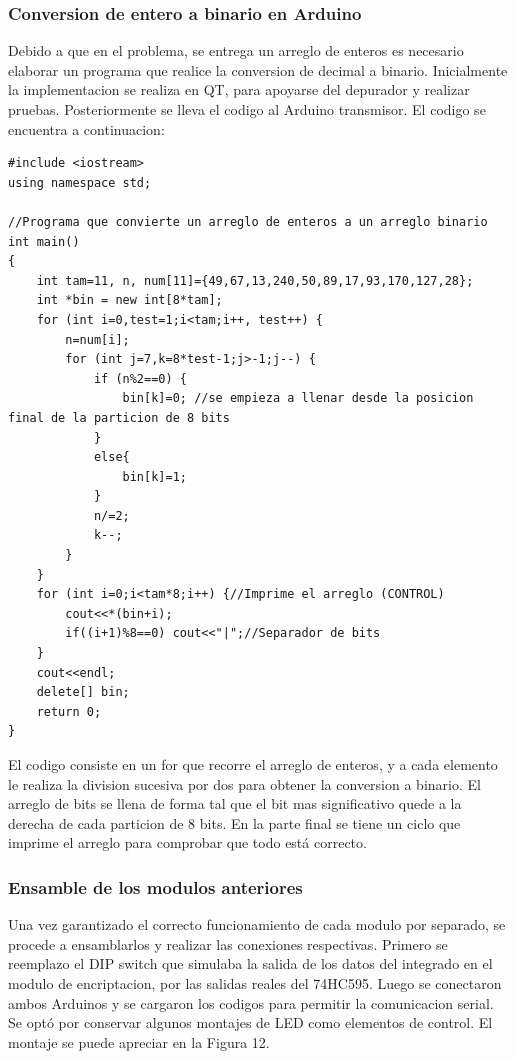 \documentclass{article}
\begin{document}
\subsubsection{Conversion de entero a binario en Arduino}
Debido a que en el problema, se entrega un arreglo de enteros es necesario elaborar un programa que realice la conversion de decimal a binario. Inicialmente la implementacion se realiza en QT, para apoyarse del depurador y realizar pruebas. Posteriormente se lleva el codigo al Arduino transmisor. El codigo se encuentra a continuacion:

\noindent


\begin{lstlisting}[style=C++]
#include <iostream>
using namespace std;

//Programa que convierte un arreglo de enteros a un arreglo binario
int main()
{
    int tam=11, n, num[11]={49,67,13,240,50,89,17,93,170,127,28};
    int *bin = new int[8*tam];
    for (int i=0,test=1;i<tam;i++, test++) {
        n=num[i];
        for (int j=7,k=8*test-1;j>-1;j--) {
            if (n%2==0) {
                bin[k]=0; //se empieza a llenar desde la posicion final de la particion de 8 bits
            }
            else{
                bin[k]=1;
            }
            n/=2;
            k--;
        }
    }
    for (int i=0;i<tam*8;i++) {//Imprime el arreglo (CONTROL)
        cout<<*(bin+i);
        if((i+1)%8==0) cout<<"|";//Separador de bits
    }
    cout<<endl;
    delete[] bin;
    return 0;
}
\end{lstlisting}

El codigo consiste en un for que recorre el arreglo de enteros, y a cada elemento le realiza la division sucesiva por dos para obtener la conversion a binario. El arreglo de bits se llena de forma tal que el bit mas significativo quede a la derecha de cada particion de 8 bits.
En la parte final se tiene un ciclo que imprime el arreglo para comprobar que todo está correcto.

\subsubsection{Ensamble de los modulos anteriores}
Una vez garantizado el correcto funcionamiento de cada modulo por separado, se procede a ensamblarlos y realizar las conexiones respectivas. Primero se reemplazo el DIP switch que simulaba la salida de los datos del integrado en el modulo de encriptacion, por las salidas reales del 74HC595. Luego se conectaron ambos Arduinos y se cargaron los codigos para permitir la comunicacion serial. Se optó por conservar algunos montajes de LED como elementos de control. El montaje se puede apreciar en la Figura 12.
\end{document}
